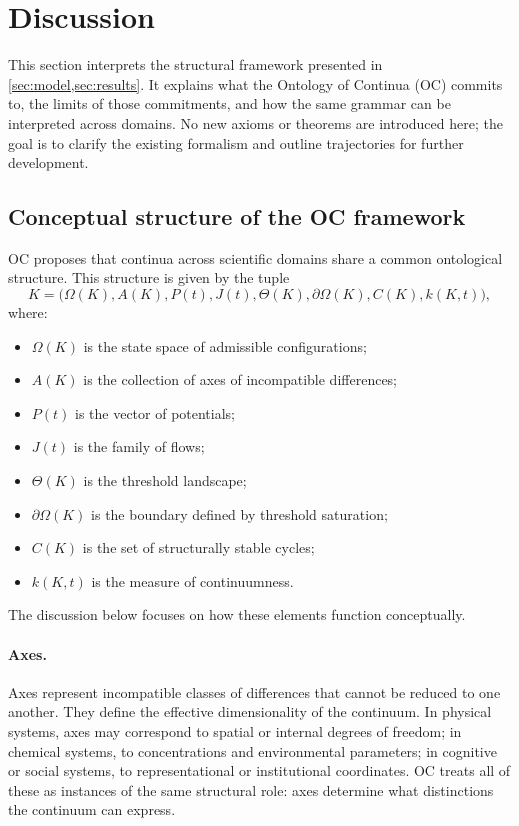 
\section{Discussion}
\label{sec:discussion}

This section interprets the structural framework presented in
\cref{sec:model,sec:results}. It explains what the Ontology of
Continua (OC) commits to, the limits of those commitments, and how the same
grammar can be interpreted across domains.
No new axioms or theorems are introduced here; the goal is to clarify the
existing formalism and outline trajectories for further development.

\subsection{Conceptual structure of the OC framework}

OC proposes that continua across scientific domains share a common ontological structure.
This structure is given by the tuple
\[
  K = \big(\Omega(K), A(K), P(t), J(t), \Theta(K), \partial\Omega(K), C(K), k(K,t)\big),
\]
where:
\begin{itemize}
    \item \(\Omega(K)\) is the state space of admissible configurations;
    \item \(A(K)\) is the collection of axes of incompatible differences;
    \item \(P(t)\) is the vector of potentials;
    \item \(J(t)\) is the family of flows;
    \item \(\Theta(K)\) is the threshold landscape;
    \item \(\partial\Omega(K)\) is the boundary defined by threshold saturation;
    \item \(C(K)\) is the set of structurally stable cycles;
    \item \(k(K,t)\) is the measure of continuumness.
\end{itemize}

The discussion below focuses on how these elements function conceptually.

\paragraph{Axes.}
Axes represent incompatible classes of differences that cannot be reduced to one another.
They define the effective dimensionality of the continuum.
In physical systems, axes may correspond to spatial or internal degrees of freedom; 
in chemical systems, to concentrations and environmental parameters; 
in cognitive or social systems, to representational or institutional coordinates.
OC treats all of these as instances of the same structural role: axes determine what distinctions the continuum can express.

